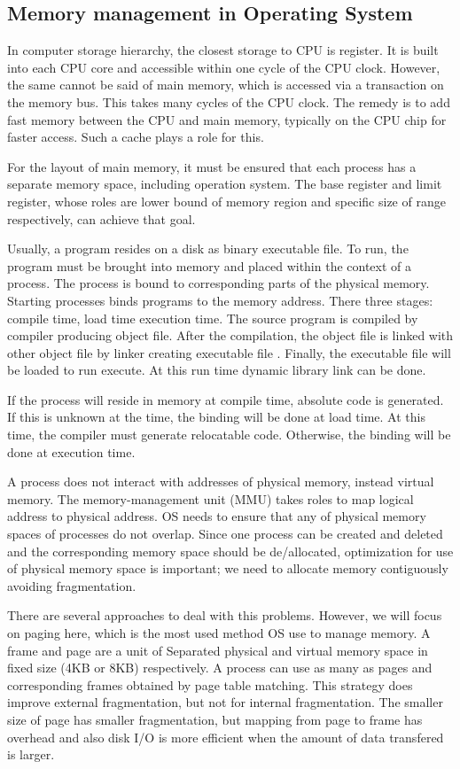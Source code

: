 \subsection{Memory management in Operating System}
\label{sec:os_memmanage}
In computer storage hierarchy, the closest storage to CPU is register. It is built into each CPU core and accessible within one cycle of the CPU clock.
However, the same cannot be said of main memory, which is accessed via a transaction on the memory bus. This takes many cycles of the CPU clock.
The remedy is to add fast memory between the CPU and main memory, typically on the CPU chip for faster access. Such a cache plays a role for this.

For the layout of main memory, it must be ensured that each process has a separate memory space, including operation system. 
The base register and limit register, whose roles are lower bound of memory region and specific size of range respectively, can achieve that goal. 

Usually, a program resides on a disk as binary executable file. To run, the program must be brought into memory and placed within the context of a process.
The process is bound to corresponding parts of the physical memory. Starting processes binds programs to the memory address. 
There three stages: compile time, load time execution time. The source program is compiled by compiler producing object file. 
After the compilation, the object file is linked with other object file by linker creating executable file . 
Finally, the executable file will be loaded to run execute. At this run time dynamic library link can be done.

If the process will reside in memory at compile time, absolute code is generated. If this is unknown at the time, 
the binding will be done at load time. At this time, the compiler must generate relocatable code. Otherwise, the binding will be done at 
execution time.

A process does not interact with addresses of physical memory, instead virtual memory. The memory-management unit (MMU) takes roles to map 
logical address to physical address. OS needs to ensure that any of physical memory spaces of processes do not overlap. 
Since one process can be created and deleted and the corresponding memory space should be de/allocated, 
optimization for use of physical memory space is important; we need to allocate memory contiguously avoiding fragmentation.

There are several approaches to deal with this problems. However, we will focus on paging here, which is the most used method OS use to manage memory.
A frame and page are a unit of Separated physical and virtual memory space in fixed size (4KB or 8KB) respectively.
A process can use as many as pages and corresponding frames obtained by page table matching. This strategy does improve external fragmentation, but not for internal fragmentation.
The smaller size of page has smaller fragmentation, but mapping from page to frame has overhead and also disk I/O is more efficient when the amount of data transfered is larger.



